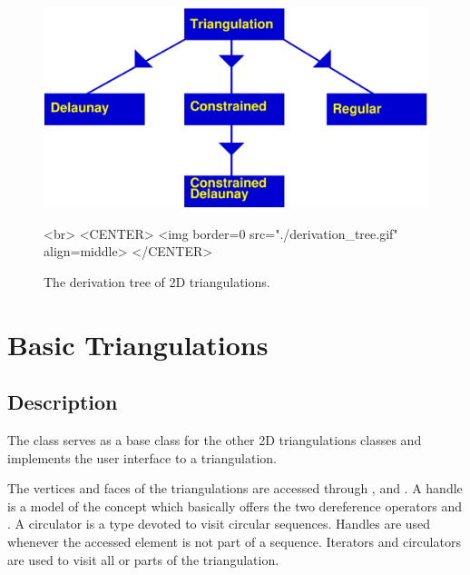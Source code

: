 \begin{figure}
\begin{ccTexOnly}
\begin{center}
\includegraphics[width=13cm]{Triangulation_2/derivation_tree} 
\end{center}
\end{ccTexOnly}

\begin{ccHtmlOnly}
<br>
<CENTER>
<img border=0 src="./derivation_tree.gif" align=middle>
</CENTER>
\end{ccHtmlOnly}

\caption{The derivation tree of 2D triangulations.}
\label{2D_Triangulation_Fig_derivation_tree}
\end{figure}

\section{Basic Triangulations\label{Section_2D_Triangulations_Basic}}

\subsection{Description\label{Subsection_2D_Triangulations_Basic_Description}}

The class 
serves as a base class for the other
2D triangulations classes
and 
 implements the user
interface to a triangulation.




The vertices and faces of the triangulations are accessed through 
,
 and .
A handle is a model of the concept  which basically
offers the two dereference operators  \ccc{*}  and \ccc{->} .
A circulator is a type devoted to visit circular sequences.
Handles are used whenever the accessed element 
is not part of a sequence.
Iterators  and circulators are used
to visit  all or parts of the triangulation.


